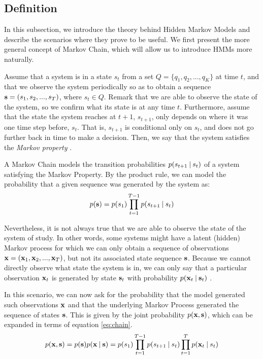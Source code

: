 \documentclass[../main.tex]{subfiles}
\begin{document}
\subsection{Definition} \label{subsection_defhmms}
In this subsection, we introduce the theory behind Hidden Markov Models and describe the scenarios where they prove to be useful. We first present the more general concept of Markov Chain, which will allow us to introduce HMMs more naturally. 
\par Assume that a system is in a state $s_t$ from a set $Q = \{ q_1, q_2, ..., q_K \}$ at time $t$, and that we observe the system periodically so as to obtain a sequence $\mathbf{s} = \left( s_1, s_2, ..., s_T \right)$, where $s_t \in Q$. Remark that we are able to observe the state of the system, so we confirm what its state is at any time $t$. Furthermore, assume that the state the system reaches at $t+1$, $s_{t+1}$, only depends on where it was one time step before, $s_t$. That is, $s_{t+1}$ is conditional only on $s_{t}$, and does not go further back in time to make a decision. Then, we say that the system satisfies the \emph{Markov property} \cite{Murphy2012}.
\par A Markov Chain models the transition probabilities $p(s_{t+1} \:\vert\: s_t)$ of a system satisfying the Markov Property. By the product rule, we can model the probability that a given sequence was generated by the system as:
\begin{equation}\label{eq:chain}
p(\mathbf{s}) = p(s_1)\prod_{t=1}^{T-1}p(s_{t+1} \:\vert\: s_t)
\end{equation}
\par Nevertheless, it is not always true that we are able to observe the state of the system of study. In other words, some systems might have a latent (hidden) Markov process for which we can only obtain a sequence of observations $\mathbf{x} = \left( \mathbf{x}_1, \mathbf{x}_2, ..., \mathbf{x}_T \right)$, but not its associated state sequence $\mathbf{s}$. Because we cannot directly observe what state the system is in, we can only say that a particular observation $\mathbf{x}_t$ is generated by state $\mathbf{s}_t$ with probability $p(\mathbf{x}_t \:\vert\: \mathbf{s}_t)$ \cite{Murphy2012}. 
\par In this scenario, we can now ask for the probability that the model generated such observations $\mathbf{x}$ and that the underlying Markov Process generated the sequence of states $\mathbf{s}$. This is given by the joint probability $p(\mathbf{x}, \mathbf{s})$, which can be expanded in terms of equation \ref{eq:chain}.
\begin{equation}\label{eq:hmm}
p(\mathbf{x}, \mathbf{s}) = p(\mathbf{s})p(\mathbf{x} \:\vert\: \mathbf{s}) = p(s_1)\prod_{t=1}^{T-1}p(s_{t+1}\:\vert\: s_t)\prod_{t=1}^Tp(\mathbf{x}_t \:\vert\: s_t)
\end{equation} 
\end{document}
